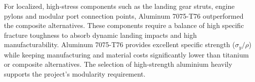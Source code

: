 For localized, high-stress components such as the landing gear struts, engine pylons and modular port connection points, Aluminum 7075-T76 outperformed the composite alternatives. These components require a balance of high specific fracture toughness to absorb dynamic landing impacts and high manufacturability. Aluminum 7075-T76 provides excellent specific strength ($\sigma_y/\rho$) while keeping manufacturing and material costs significantly lower than titanium or composite alternatives. The selection of high-strength aluminium heavily supports the project's modularity requirement.
